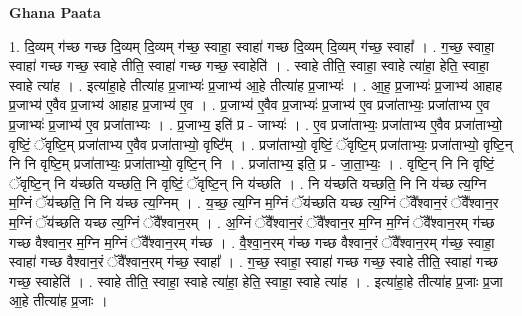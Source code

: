 \documentclass[17pt]{extarticle}
\begin{document}
\textbf{Ghana Paata } \newline

1. दि॒व्यम् ग॑च्छ गच्छ दि॒व्यम् दि॒व्यम् ग॑च्छ॒ स्वाहा॒ स्वाहा॑ गच्छ दि॒व्यम् दि॒व्यम् ग॑च्छ॒ स्वाहा᳚ । . ग॒च्छ॒ स्वाहा॒ स्वाहा॑ गच्छ गच्छ॒ स्वाहे तीति॒ स्वाहा॑ गच्छ गच्छ॒ स्वाहेति॑ । . स्वाहे तीति॒ स्वाहा॒ स्वाहे त्या॑हा॒ हेति॒ स्वाहा॒ स्वाहे त्या॑ह । . इत्या॑हा॒हे तीत्या॑ह प्र॒जाभ्यः॑ प्र॒जाभ्य॑ आ॒हे तीत्या॑ह प्र॒जाभ्यः॑ । . आ॒ह॒ प्र॒जाभ्यः॑ प्र॒जाभ्य॑ आहाह प्र॒जाभ्य॑ ए॒वैव प्र॒जाभ्य॑ आहाह प्र॒जाभ्य॑ ए॒व । . प्र॒जाभ्य॑ ए॒वैव प्र॒जाभ्यः॑ प्र॒जाभ्य॑ ए॒व प्रजा॑ताभ्यः॒ प्रजा॑ताभ्य ए॒व प्र॒जाभ्यः॑ प्र॒जाभ्य॑ ए॒व प्रजा॑ताभ्यः । . प्र॒जाभ्य॒ इति॑ प्र - जाभ्यः॑ । . ए॒व प्रजा॑ताभ्यः॒ प्रजा॑ताभ्य ए॒वैव प्रजा॑ताभ्यो॒ वृष्टिं॒ ॅवृष्टि॒म् प्रजा॑ताभ्य ए॒वैव प्रजा॑ताभ्यो॒ वृष्टि᳚म् । . प्रजा॑ताभ्यो॒ वृष्टिं॒ ॅवृष्टि॒म् प्रजा॑ताभ्यः॒ प्रजा॑ताभ्यो॒ वृष्टि॒न् नि नि वृष्टि॒म् प्रजा॑ताभ्यः॒ प्रजा॑ताभ्यो॒ वृष्टि॒न् नि । . प्रजा॑ताभ्य॒ इति॒ प्र - जा॒ता॒भ्यः॒ । . वृष्टि॒न् नि नि वृष्टिं॒ ॅवृष्टि॒न् नि य॑च्छति यच्छति॒ नि वृष्टिं॒ ॅवृष्टि॒न् नि य॑च्छति । . नि य॑च्छति यच्छति॒ नि नि य॑च्छ त्य॒ग्नि म॒ग्निं ॅय॑च्छति॒ नि नि य॑च्छ त्य॒ग्निम् । . य॒च्छ॒ त्य॒ग्नि म॒ग्निं ॅय॑च्छति यच्छ त्य॒ग्निं ॅवै᳚श्वान॒रं ॅवै᳚श्वान॒र म॒ग्निं ॅय॑च्छति यच्छ त्य॒ग्निं ॅवै᳚श्वान॒रम् । . अ॒ग्निं ॅवै᳚श्वान॒रं ॅवै᳚श्वान॒र म॒ग्नि म॒ग्निं ॅवै᳚श्वान॒रम् ग॑च्छ गच्छ वैश्वान॒र म॒ग्नि म॒ग्निं ॅवै᳚श्वान॒रम् ग॑च्छ । . वै॒श्वा॒न॒रम् ग॑च्छ गच्छ वैश्वान॒रं ॅवै᳚श्वान॒रम् ग॑च्छ॒ स्वाहा॒ स्वाहा॑ गच्छ वैश्वान॒रं ॅवै᳚श्वान॒रम् ग॑च्छ॒ स्वाहा᳚ । . ग॒च्छ॒ स्वाहा॒ स्वाहा॑ गच्छ गच्छ॒ स्वाहे तीति॒ स्वाहा॑ गच्छ गच्छ॒ स्वाहेति॑ । . स्वाहे तीति॒ स्वाहा॒ स्वाहे त्या॑हा॒ हेति॒ स्वाहा॒ स्वाहे त्या॑ह । . इत्या॑हा॒हे तीत्या॑ह प्र॒जाः प्र॒जा आ॒हे तीत्या॑ह प्र॒जाः । \newline
\end{document}
